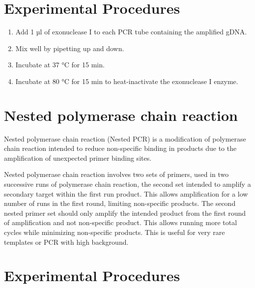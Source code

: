 \documentclass[]{book}
\providecommand{\tightlist}{%
  \setlength{\itemsep}{0pt}\setlength{\parskip}{0pt}}
\theoremstyle{definition}
\theoremstyle{definition}
\theoremstyle{definition}
\theoremstyle{remark}
\begin{document}
\section{Experimental Procedures}\label{experimental-procedures-9}

\begin{enumerate}
\def\labelenumi{\arabic{enumi}.}
\tightlist
\item
  Add 1 µl of exonuclease I to each PCR tube containing the amplified
  gDNA.
\item
  Mix well by pipetting up and down.
\item
  Incubate at 37 °C for 15 min.
\item
  Incubate at 80 °C for 15 min to heat-inactivate the exonuclease I
  enzyme.
\end{enumerate}

\section{Nested polymerase chain
reaction}\label{nested-polymerase-chain-reaction}

Nested polymerase chain reaction (Nested PCR) is a modification of
polymerase chain reaction intended to reduce non-specific binding in
products due to the amplification of unexpected primer binding sites.

Nested polymerase chain reaction involves two sets of primers, used in
two successive runs of polymerase chain reaction, the second set
intended to amplify a secondary target within the first run product.
This allows amplification for a low number of runs in the first round,
limiting non-specific products. The second nested primer set should only
amplify the intended product from the first round of amplification and
not non-specific product. This allows running more total cycles while
minimizing non-specific products. This is useful for very rare templates
or PCR with high background.

\section{Experimental Procedures}\label{experimental-procedures-10}
\end{document}
